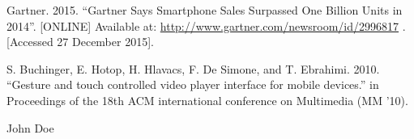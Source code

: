 \documentclass[conference]{IEEEtran}
\begin{document}
\begin{thebibliography}{1}
Gartner. 2015. ``Gartner Says Smartphone Sales Surpassed One Billion Units in 2014''. [ONLINE] Available at: \url{http://www.gartner.com/newsroom/id/2996817} . [Accessed 27 December 2015].

S. Buchinger, E. Hotop, H. Hlavacs, F. De Simone, and T. Ebrahimi. 2010. ``Gesture and touch controlled video player interface for mobile devices.'' in Proceedings of the 18th ACM international conference on Multimedia (MM '10).


\end{thebibliography}

% 

\begin{IEEEbiography}{John Doe}
\blindtext
\end{IEEEbiography}







\end{document}
